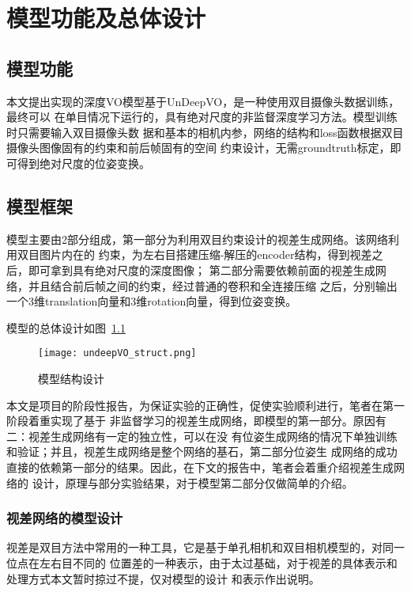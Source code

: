 \chapter{模型功能及总体设计}
\label{cha:intro}

\section{模型功能}

本文提出实现的深度VO模型基于UnDeepVO\cite{li2018undeepvo}，是一种使用双目摄像头数据训练，最终可以
在单目情况下运行的，具有绝对尺度的非监督深度学习方法。模型训练时只需要输入双目摄像头数
据和基本的相机内参，网络的结构和loss函数根据双目摄像头图像固有的约束和前后帧固有的空间
约束设计，无需groundtruth标定，即可得到绝对尺度的位姿变换。

\section{模型框架}

模型主要由2部分组成，第一部分为利用双目约束设计的视差生成网络。该网络利用双目图片内在的
约束，为左右目搭建压缩-解压的encoder结构，得到视差之后，即可拿到具有绝对尺度的深度图像；
第二部分需要依赖前面的视差生成网络，并且结合前后帧之间的约束，经过普通的卷积和全连接压缩
之后，分别输出一个3维translation向量和3维rotation向量，得到位姿变换。

模型的总体设计如图~\ref{fig:undeepVO_struct}


\begin{figure}
	\centering
	\texttt{[image: undeepVO\_struct.png]}
	\caption{模型结构设计}
	\label{fig:undeepVO_struct}
\end{figure}

本文是项目的阶段性报告，为保证实验的正确性，促使实验顺利进行，笔者在第一阶段着重实现了基于
非监督学习的视差生成网络，即模型的第一部分。原因有二：视差生成网络有一定的独立性，可以在没
有位姿生成网络的情况下单独训练和验证；并且，视差生成网络是整个网络的基石，第二部分位姿生
成网络的成功直接的依赖第一部分的结果。因此，在下文的报告中，笔者会着重介绍视差生成网络的
设计，原理与部分实验结果，对于模型第二部分仅做简单的介绍。

\subsection{视差网络的模型设计}

视差是双目方法中常用的一种工具，它是基于单孔相机和双目相机模型的，对同一位点在左右目不同的
位置差的一种表示，由于太过基础，对于视差的具体表示和处理方式本文暂时掠过不提，仅对模型的设计
和表示作出说明。

